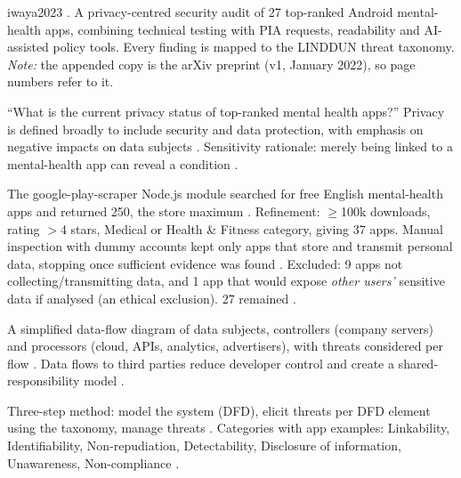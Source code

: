 \begin{papercard}{iwaya2023}
   . A privacy-centred security audit of 27 top-ranked Android mental-health apps, combining technical testing with PIA requests, readability and AI-assisted policy tools. Every finding is mapped to the LINDDUN threat taxonomy. \emph{Note:} the appended copy is the arXiv preprint (v1, January 2022), so page numbers refer to it.

 ``What is the current privacy status of top-ranked mental health apps?'' Privacy is defined broadly to include security and data protection, with emphasis on negative impacts on data subjects . Sensitivity rationale: merely being linked to a mental-health app can reveal a condition .

 The google-play-scraper Node.js module searched for free English mental-health apps and returned 250, the store maximum . Refinement: $\geq$100k downloads, rating $>$4 stars, Medical or Health \& Fitness category, giving 37 apps. Manual inspection with dummy accounts kept only apps that store and transmit personal data, stopping once sufficient evidence was found . Excluded: 9 apps not collecting/transmitting data, and 1 app that would expose \emph{other users'} sensitive data if analysed (an ethical exclusion). 27 remained .

 A simplified data-flow diagram of data subjects, controllers (company servers) and processors (cloud, APIs, analytics, advertisers), with threats considered per flow . Data flows to third parties reduce developer control and create a shared-responsibility model .

 Three-step method: model the system (DFD), elicit threats per DFD element using the taxonomy, manage threats . Categories with app examples: Linkability, Identifiability, Non-repudiation, Detectability, Disclosure of information, Unawareness, Non-compliance .


\end{papercard}
